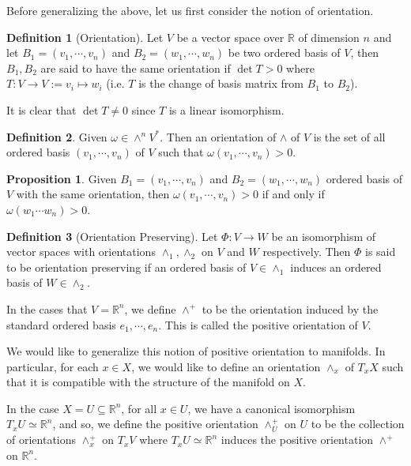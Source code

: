 \documentclass[]{article}
\theoremstyle{definition}
\theoremstyle{definition}
\newtheorem{definition}{Definition}[section]
\newtheorem{proposition}{Proposition}[section]
\begin{document}
Before generalizing the above, let us first consider the notion of 
orientation.

\begin{definition}[Orientation]
  Let \(V\) be a vector space over \(\mathbb{R}\) of dimension \(n\) and let 
  \(B_1 = (v_1, \cdots, v_n)\) and \(B_2 = (w_1, \cdots, w_n)\) be two ordered 
  basis of \(V\), then \(B_1, B_2\) are said to have the same orientation if 
  \(\det T > 0\) where \(T : V \to V := v_i \mapsto w_i\) (i.e. \(T\) is the 
  change of basis matrix from \(B_1\) to \(B_2\)).
\end{definition}

It is clear that \(\det T \neq 0\) since \(T\) is a linear isomorphism.

\begin{definition}
  Given \(\omega \in \wedge^n V^*\). Then an orientation of \(\wedge\) of \(V\) 
  is the set of all ordered basis \((v_1, \cdots, v_n)\) of \(V\) such that
  \(\omega(v_1, \cdots, v_n) > 0\).
\end{definition}

\begin{proposition}
  Given \(B_1 = (v_1, \cdots, v_n)\) and \(B_2 = (w_1, \cdots, w_n)\) ordered 
  basis of \(V\) with the same orientation, then \(\omega(v_1, \cdots, v_n) > 0\) 
  if and only if \(\omega(w_1 \cdots w_n) > 0\).
\end{proposition}

\begin{definition}[Orientation Preserving]
  Let \(\Phi : V \to W\) be an isomorphism of vector spaces with orientations 
  \(\wedge_1, \wedge_2\) on \(V\) and \(W\) respectively. Then \(\Phi\) is said 
  to be orientation preserving if an ordered basis of \(V \in \wedge_1\) induces 
  an ordered basis of \(W \in \wedge_2\).
\end{definition}

In the cases that \(V = \mathbb{R}^n\), we define \(\wedge^+\) to be the 
orientation induced by the standard ordered basis \(e_1, \cdots, e_n\). This 
is called the positive orientation of \(V\).

We would like to generalize this notion of positive orientation to manifolds. In particular, 
for each \(x \in X\), we would like to define an orientation \(\wedge_x\) of 
\(T_x X\) such that it is compatible with the structure of the manifold on \(X\).

In the case \(X = U \subseteq \mathbb{R}^n\), for all \(x \in U\), we have 
a canonical isomorphism \(T_x U \simeq \mathbb{R}^n\), and so, we define the 
positive orientation \(\wedge_U^+\) on \(U\) to be the collection of orientations 
\(\wedge_x^+\) on \(T_x V\) where \(T_x U \simeq \mathbb{R}^n\) induces the 
positive orientation \(\wedge^+\) on \(\mathbb{R}^n\).
\end{document}
